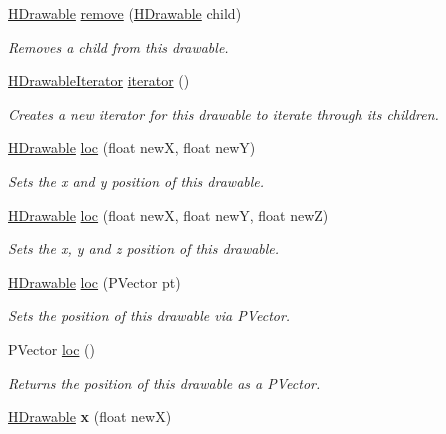 \begin{DoxyCompactItemize}
\hyperlink{classhype_1_1drawable_1_1_h_drawable}{H\-Drawable} \hyperlink{classhype_1_1drawable_1_1_h_drawable_a3c326700c8b7b41da16d435730c6706b}{remove} (\hyperlink{classhype_1_1drawable_1_1_h_drawable}{H\-Drawable} child)
\begin{DoxyCompactList}\small\item\em Removes a child from this drawable. \end{DoxyCompactList}\item 
\hyperlink{classhype_1_1drawable_1_1_h_drawable_1_1_h_drawable_iterator}{H\-Drawable\-Iterator} \hyperlink{classhype_1_1drawable_1_1_h_drawable_ae15ca1c6555696a54faa7b61b3bcc1ff}{iterator} ()
\begin{DoxyCompactList}\small\item\em Creates a new iterator for this drawable to iterate through its children. \end{DoxyCompactList}\item 
\hyperlink{classhype_1_1drawable_1_1_h_drawable}{H\-Drawable} \hyperlink{classhype_1_1drawable_1_1_h_drawable_aa8daf32b814e1e5b9de2ff1e832f3f8d}{loc} (float new\-X, float new\-Y)
\begin{DoxyCompactList}\small\item\em Sets the x and y position of this drawable. \end{DoxyCompactList}\item 
\hyperlink{classhype_1_1drawable_1_1_h_drawable}{H\-Drawable} \hyperlink{classhype_1_1drawable_1_1_h_drawable_a038b80d3aa227ff8f7ec2acdfdd09baf}{loc} (float new\-X, float new\-Y, float new\-Z)
\begin{DoxyCompactList}\small\item\em Sets the x, y and z position of this drawable. \end{DoxyCompactList}\item 
\hyperlink{classhype_1_1drawable_1_1_h_drawable}{H\-Drawable} \hyperlink{classhype_1_1drawable_1_1_h_drawable_afbaa98393436b661f7686ab3babcb01a}{loc} (P\-Vector pt)
\begin{DoxyCompactList}\small\item\em Sets the position of this drawable via P\-Vector. \end{DoxyCompactList}\item 
P\-Vector \hyperlink{classhype_1_1drawable_1_1_h_drawable_af14ffd5baa83781131e96ef30915ca64}{loc} ()
\begin{DoxyCompactList}\small\item\em Returns the position of this drawable as a P\-Vector. \end{DoxyCompactList}\item 
\hypertarget{classhype_1_1drawable_1_1_h_drawable_aae828fe1677025d019df207f62771def}{\hyperlink{classhype_1_1drawable_1_1_h_drawable}{H\-Drawable} {\bfseries x} (float new\-X)}\label{classhype_1_1drawable_1_1_h_drawable_aae828fe1677025d019df207f62771def}


\end{DoxyCompactItemize}
